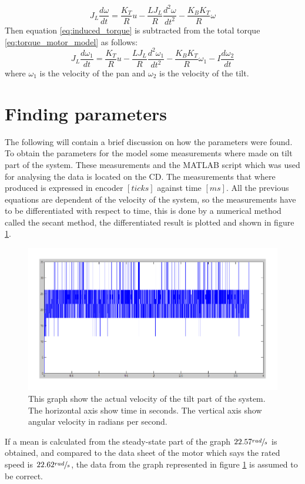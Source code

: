 \begin{equation}
	J_L \frac{d\omega}{dt} = \frac{K_T}{R} u - \frac{L J_L}{R} \frac{d^{2}\omega}{dt^{2}} - \frac{K_B K_T}{R} \omega\label{eq:torque_motor_model}
\end{equation}
Then equation \ref{eq:induced_torque} is subtracted from the total torque \ref{eq:torque_motor_model} as follows:
\begin{equation}
	J_L \frac{d\omega_{1}}{dt} = \frac{K_T}{R} u - \frac{L J_L}{R} \frac{d^{2}\omega_{1}}{dt^{2}} - \frac{K_B K_T}{R} \omega_{1} - I \frac{d\omega_{2}}{dt}\label{eq:coupled_torque_motor_model}
\end{equation}
where $\omega_1$ is the velocity of the pan and $\omega_2$ is the velocity of the tilt. 

\section{Finding parameters}
The following will contain a brief discussion on how the parameters were found. To obtain the parameters for the model some measurements where made on tilt part of the system. These measurements and the MATLAB script which was used for analysing the data is located on the CD. The measurements that where produced is expressed in encoder $[ticks]$ against time $[ms]$. All the previous equations are dependent of the velocity of the system, so the measurements have to be differentiated with respect to time, this is done by a numerical method called the secant method, the differentiated result is plotted and shown in figure \ref{fig:measured_step_tilt}.
\begin{figure}[htb]
	\begin{center}
	\includegraphics[scale=1,trim=0 0 0 0]{graphics/measured_step_tilt.pdf} %
	\caption{This graph show the actual velocity of the tilt part of the system. The horizontal axis show time in seconds. The vertical axis show angular velocity in radians per second.}
	\label{fig:measured_step_tilt}			%
	\end{center}
\end{figure}
If a mean is calculated from the steady-state part of the graph $22.57 \sfrac{rad}{s}$ is obtained, and compared to the data sheet of the motor which says the rated speed is $22.62 \sfrac{rad}{s}$, the data from the graph represented in figure \ref{fig:measured_step_tilt} is assumed to be correct.

